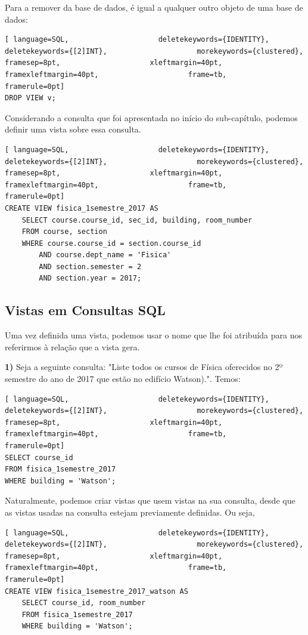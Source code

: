 \documentclass[oneside]{book}
\theoremstyle{definition}
\begin{document}
Para a remover da base de dados, é igual a qualquer outro objeto de uma base de dados:
\begin{lstlisting}[ language=SQL,                     deletekeywords={IDENTITY},                     deletekeywords={[2]INT},                     morekeywords={clustered},                     framesep=8pt,                     xleftmargin=40pt,                     framexleftmargin=40pt,                     frame=tb,                     framerule=0pt]
DROP VIEW v;
\end{lstlisting}

Considerando a consulta que foi apresentada no início do sub-capítulo, podemos definir uma vista sobre essa consulta.
\begin{lstlisting}[ language=SQL,                     deletekeywords={IDENTITY},                     deletekeywords={[2]INT},                     morekeywords={clustered},                     framesep=8pt,                     xleftmargin=40pt,                     framexleftmargin=40pt,                     frame=tb,                     framerule=0pt]
CREATE VIEW fisica_1semestre_2017 AS
    SELECT course.course_id, sec_id, building, room_number
    FROM course, section
    WHERE course.course_id = section.course_id
        AND course.dept_name = 'Fisica'
        AND section.semester = 2
        AND section.year = 2017;
\end{lstlisting}

\subsection{Vistas em Consultas SQL}
Uma vez definida uma vista, podemos usar o nome que lhe foi atribuída para nos referirmos à relação que a vista gera.

\textbf{1)} Seja a seguinte consulta: "Liste todos os cursos de Física oferecidos no 2º semestre do ano de 2017 que estão no edifício Watson).". Temos:
\begin{lstlisting}[ language=SQL,                     deletekeywords={IDENTITY},                     deletekeywords={[2]INT},                     morekeywords={clustered},                     framesep=8pt,                     xleftmargin=40pt,                     framexleftmargin=40pt,                     frame=tb,                     framerule=0pt]
SELECT course_id
FROM fisica_1semestre_2017
WHERE building = 'Watson';
\end{lstlisting}

Naturalmente, podemos criar vistas que usem vistas na sua consulta, desde que as vistas usadas na consulta estejam previamente definidas. Ou seja,
\begin{lstlisting}[ language=SQL,                     deletekeywords={IDENTITY},                     deletekeywords={[2]INT},                     morekeywords={clustered},                     framesep=8pt,                     xleftmargin=40pt,                     framexleftmargin=40pt,                     frame=tb,                     framerule=0pt]
CREATE VIEW fisica_1semestre_2017_watson AS
    SELECT course_id, room_number
    FROM fisica_1semestre_2017
    WHERE building = 'Watson';
\end{lstlisting}
\end{document}
